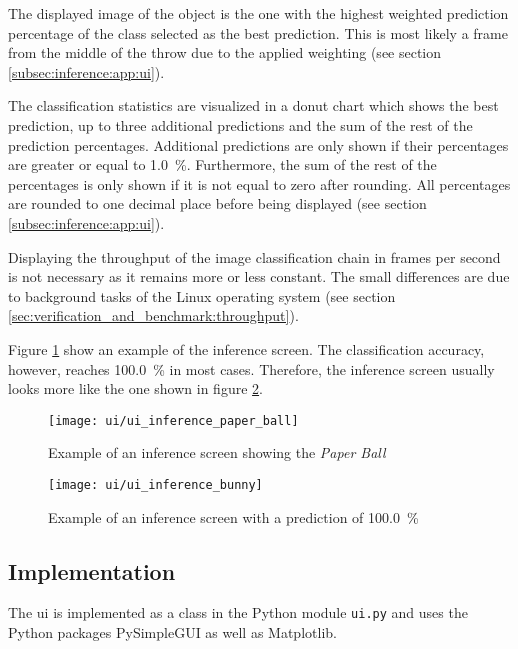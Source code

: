 The displayed image of the object is the one with the highest weighted prediction percentage of the class selected as the best prediction.
This is most likely a frame from the middle of the throw due to the applied weighting (see section \ref{subsec:inference:app:ui}).

The classification statistics are visualized in a donut chart which shows the best prediction, up to three additional predictions and the sum of the rest of the prediction percentages.
Additional predictions are only shown if their percentages are greater or equal to \SI{1.0}{\percent}.
Furthermore, the sum of the rest of the percentages is only shown if it is not equal to zero after rounding.
All percentages are rounded to one decimal place before being displayed (see section \ref{subsec:inference:app:ui}).

Displaying the throughput of the image classification chain in frames per second is not necessary as it remains more or less constant.
The small differences are due to background tasks of the Linux operating system (see section \ref{sec:verification_and_benchmark:throughput}).

Figure \ref{fig:ui_inference_paper_ball} show an example of the inference screen.
The classification accuracy, however, reaches \SI{100.0}{\percent} in most cases.
Therefore, the inference screen usually looks more like the one shown in figure \ref{fig:ui_inference_bunny}.

\begin{figure}
  \centering
  \texttt{[image: ui/ui\_inference\_paper\_ball]}
  \caption{Example of an inference screen showing the \textit{Paper Ball}}
  \label{fig:ui_inference_paper_ball}
\end{figure}

\begin{figure}
  \centering
  \texttt{[image: ui/ui\_inference\_bunny]}
  \caption{Example of an inference screen with a prediction of \SI{100.0}{\percent}}
  \label{fig:ui_inference_bunny}
\end{figure}

\subsection{Implementation}
\label{subsec:inference:user_interface:implementation}

The \acrlong{ui} is implemented as a class in the Python module \texttt{ui.py} and uses the Python packages PySimpleGUI as well as Matplotlib.

